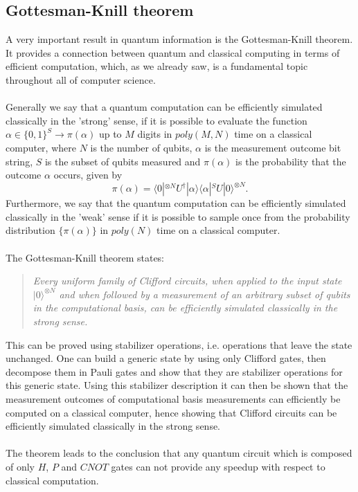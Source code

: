 \subsection{Gottesman-Knill theorem}
A very important result in quantum information is the Gottesman-Knill theorem. It provides a connection between quantum and classical computing in terms of efficient computation, which, as we already saw, is a fundamental topic throughout all of computer science. \\
\\
Generally we say that a quantum computation can be efficiently simulated classically in the 'strong' sense, if it is possible to evaluate the function $\alpha \in \{0,1\}^S \rightarrow \pi(\alpha)$ up to $M$ digits in $poly(M,N)$ time on a classical computer, where $N$ is the number of qubits, $\alpha$ is the measurement outcome bit string, $S$ is the subset of qubits measured and $\pi(\alpha)$ is the probability that the outcome $\alpha$ occurs, given by
\begin{equation}
    \pi(\alpha) = \langle0|^{\otimes N}U^{\dagger}|\alpha\rangle\langle\alpha|^S U|0\rangle^{\otimes N}.
\end{equation}
Furthermore, we say that the quantum computation can be efficiently simulated classically in the 'weak' sense if it is possible to sample once from the probability distribution $\{ \pi(\alpha) \}$ in $poly(N)$ time on a classical computer. \\
\\
The Gottesman-Knill theorem states:
\begin{quote}
    \textit{Every uniform family of Clifford circuits, when applied to the input state $|0\rangle^{\otimes N}$ and when followed by a measurement of an arbitrary subset of qubits in the computational basis, can be efficiently simulated classically in the strong sense.}
\end{quote}
This can be proved using stabilizer operations, i.e. operations that leave the state unchanged. One can build a generic state by using only Clifford gates, then decompose them in Pauli gates and show that they are stabilizer operations for this generic state. Using this stabilizer description it can then be shown that the measurement outcomes of computational basis measurements can efficiently be computed on a classical computer, hence showing that Clifford circuits can be efficiently simulated classically in the strong sense. \\
\\
The theorem leads to the conclusion that any quantum circuit which is composed of only $H$, $P$ and $CNOT$ gates can not provide any speedup with respect to classical computation. \\
